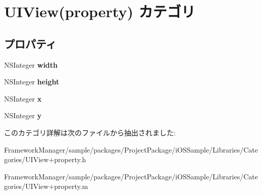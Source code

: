 \hypertarget{category_u_i_view_07property_08}{}\section{U\+I\+View(property) カテゴリ}
\label{category_u_i_view_07property_08}
\subsection*{プロパティ}
\begin{DoxyCompactItemize}
\item 
\hypertarget{category_u_i_view_07property_08_a110d3df542eec9d89dd203cc76343c00}{}N\+S\+Integer {\bfseries width}\label{category_u_i_view_07property_08_a110d3df542eec9d89dd203cc76343c00}

\item 
\hypertarget{category_u_i_view_07property_08_a8e821530b4c3d604739b5a8c457e1c16}{}N\+S\+Integer {\bfseries height}\label{category_u_i_view_07property_08_a8e821530b4c3d604739b5a8c457e1c16}

\item 
\hypertarget{category_u_i_view_07property_08_a274043fa4b9d8a9433918e5c40ff8be9}{}N\+S\+Integer {\bfseries x}\label{category_u_i_view_07property_08_a274043fa4b9d8a9433918e5c40ff8be9}

\item 
\hypertarget{category_u_i_view_07property_08_a75a06f6c420016400e3a3e28e5da66d3}{}N\+S\+Integer {\bfseries y}\label{category_u_i_view_07property_08_a75a06f6c420016400e3a3e28e5da66d3}

\end{DoxyCompactItemize}


このカテゴリ詳解は次のファイルから抽出されました\+:\begin{DoxyCompactItemize}
\item 
Framework\+Manager/sample/packages/\+Project\+Package/i\+O\+S\+Sample/\+Libraries/\+Categories/U\+I\+View+property.\+h\item 
Framework\+Manager/sample/packages/\+Project\+Package/i\+O\+S\+Sample/\+Libraries/\+Categories/U\+I\+View+property.\+m\end{DoxyCompactItemize}
